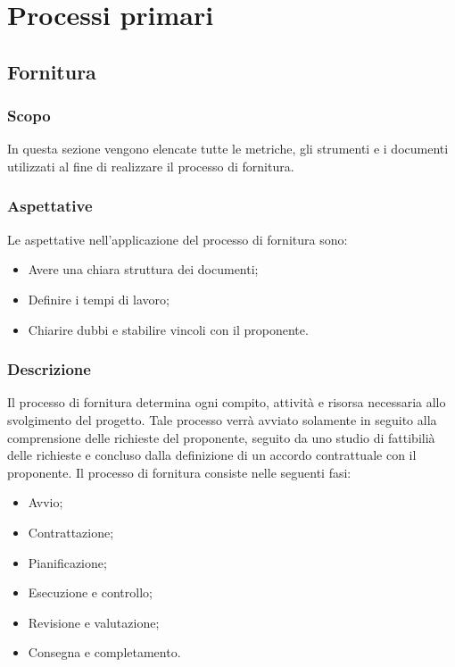 
\section{Processi primari}\label{section:Processi_primari}
\subsection{Fornitura} \label{subsection:Fornitura}
\subsubsection{Scopo}\label{subsubsection: scopo_fornitura}
In questa sezione vengono elencate tutte le metriche, gli strumenti e i documenti utilizzati al fine di realizzare il processo di fornitura.
\subsubsection{Aspettative}\label{subsubsection: aspettative_fornitura}
Le aspettative nell'applicazione del processo di fornitura sono:
\begin {itemize}
\item Avere una chiara struttura dei documenti;
\item Definire i tempi di lavoro;
\item Chiarire dubbi e stabilire vincoli con il proponente.
\end {itemize}
\subsubsection{Descrizione}\label{subsubsection: descrizione_fornitura}
Il processo di fornitura determina ogni compito, attività e risorsa necessaria allo svolgimento del progetto.
Tale processo verrà avviato solamente in seguito alla comprensione delle richieste del proponente, seguito da uno studio di fattibilià delle richieste e concluso dalla definizione di un accordo contrattuale con il proponente.
Il processo di fornitura consiste nelle seguenti fasi:
\begin {itemize}
\item Avvio;
\item Contrattazione;
\item Pianificazione;
\item Esecuzione e controllo;
\item Revisione e valutazione;
\item Consegna e completamento.
\end {itemize}
